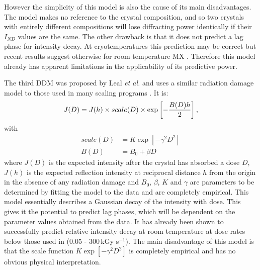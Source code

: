 However the simplicity of this model is also the cause of its main disadvantages.
The model makes no reference to the crystal composition, and so two crystals with entirely different compositions will lose diffracting power identically if their $I_{ND}$ values are the same.
\newline
The other drawback is that it does not predict a lag phase for intensity decay.
At cryotemperatures this prediction may be correct but recent results suggest otherwise for room temperature MX \cite{owen2014}.
Therefore this model already has apparent limitations in the applicability of its predictive power.

The third DDM was proposed by Leal \emph{et al.} \cite{leal2012} and uses a similar radiation damage model to those used in many scaling programs \cite{evans2013,kabsch2010}. It is:
\begin{equation}
J(D) = J(h) \times scale(D) \times \exp\left[-\frac{B(D) h}{2}\right],
\label{eq:Leal DDM}
\end{equation}
with
\begin{align}
scale(D) &= K\exp\left[-\gamma^2 D^2 \right] \label{eqscale}\\
B(D)     &= B_0 + \beta D \label{eqB}
\end{align}
where $J(D)$ is the expected intensity after the crystal has absorbed a dose $D$, $J(h)$ is the expected reflection intensity at reciprocal distance $h$ from the origin in the absence of any radiation damage and $B_0$, $\beta$, $K$ and $\gamma$ are parameters to be determined by fitting the model to the data and are completely empirical.
\newline
This model essentially describes a Gaussian decay of the intensity with dose.
This gives it the potential to predict lag phases, which will be dependent on the parameter values obtained from the data.
It has already been shown to successfully predict relative intensity decay at room temperature \cite{leal2012} at dose rates below those used in \cite{owen2014} (0.05 - 300$\,$kGy s$^{-1}$).
The main disadvantage of this model is that the scale function $K \exp\left[-\gamma^2 D^2 \right]$ is completely empirical and has no obvious physical interpretation.

